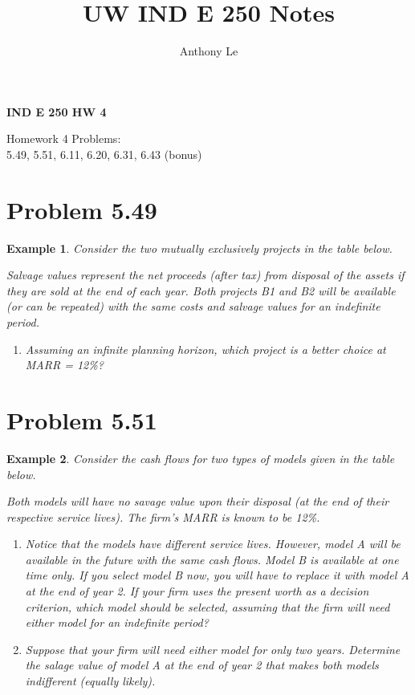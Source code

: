 \documentclass{report} %
\title{UW IND E 250 Notes}
\author{Anthony Le}
\newtheorem{exmp}{Example}
\begin{document}
\pagestyle{fancy}
\fancyhead{}


\newpage

\newpage

\newpage
\begin{center}
    \LARGE{\textbf{IND E 250 HW 4}}
\end{center}
\begin{center}
    Homework 4 Problems: \\
    5.49, 5.51, 6.11, 6.20, 6.31, 6.43 (bonus)
\end{center}

\section*{Problem 5.49}
\begin{exmp}
    Consider the two mutually exclusively projects in the table below.

    Salvage values represent the net proceeds (after tax) from disposal of the assets if they are sold at the end of each year. Both projects B1 and B2 will be available (or can be repeated) with the same costs and salvage values for an indefinite period. 
    \begin{enumerate}
        \item Assuming an infinite planning horizon, which project is a better choice at MARR = 12\%?
    \end{enumerate}
    

\end{exmp}



\section*{Problem 5.51}
\begin{exmp}
    Consider the cash flows for two types of models given in the table below. 

    Both models will have no savage value upon their disposal (at the end of their respective service lives). The firm's MARR is known to be 12\%.

    \begin{enumerate}
        \item Notice that the models have different service lives. However, model A will be available in the future with the same cash flows. Model B is available at one time only. If you select model B now, you will have to replace it with model A at the end of year 2. If your firm uses the present worth as a decision criterion, which model should be selected, assuming that the firm will need either model for an indefinite period?
        \item Suppose that your firm will need either model for only two years. Determine the salage value of model A at the end of year 2 that makes both models indifferent (equally likely).
    \end{enumerate}
\end{exmp}
\end{document}
